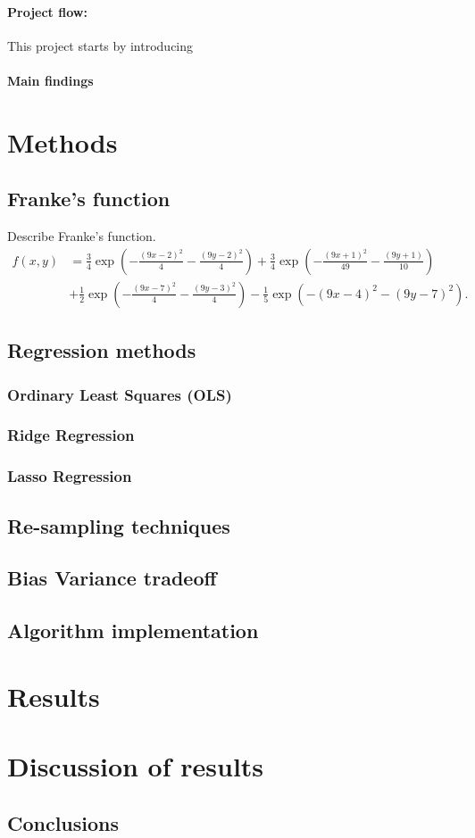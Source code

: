 \documentclass[%
oneside,                 %
final,                   %
10pt]{article}
\begin{document}
\paragraph{Project flow:} This project starts by introducing 
\paragraph{Main findings}


\section{Methods}
\subsection{Franke's function}
Describe Franke's function.
\begin{align}
f(x,y) &= \frac{3}{4}\exp{\left(-\frac{(9x-2)^2}{4} - \frac{(9y-2)^2}{4}\right)}+\frac{3}{4}\exp{\left(-\frac{(9x+1)^2}{49}- \frac{(9y+1)}{10}\right)} \\
&+\frac{1}{2}\exp{\left(-\frac{(9x-7)^2}{4} - \frac{(9y-3)^2}{4}\right)} -\frac{1}{5}\exp{\left(-(9x-4)^2 - (9y-7)^2\right) }.
\label{eq:FrankeFunction}
\end{align}
\subsection{Regression methods}
\subsubsection{Ordinary Least Squares (OLS)}
\subsubsection{Ridge Regression}
\subsubsection{Lasso Regression}
\subsection{Re-sampling techniques}
\subsection{Bias Variance tradeoff}


\subsection{Algorithm implementation}

\section{Results}

\section{Discussion of results}



\subsection{Conclusions}





\end{document}
